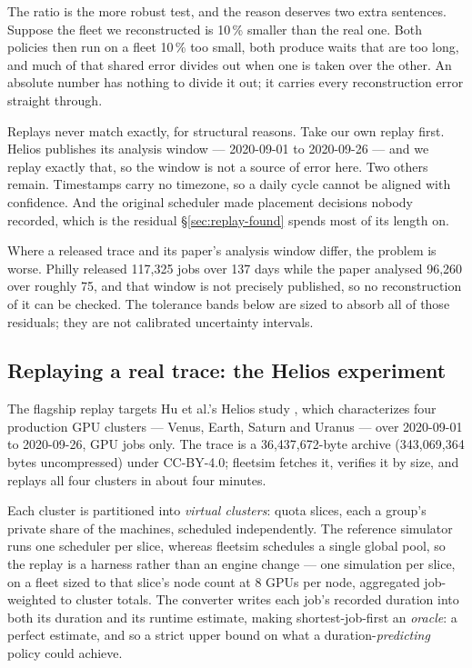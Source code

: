 The ratio is the more robust test, and the reason deserves two extra sentences.
Suppose the fleet we reconstructed is 10\,\% smaller than the real one. Both
policies then run on a fleet 10\,\% too small, both produce waits that are too
long, and much of that shared error divides out when one is taken over the other.
An absolute number has nothing to divide it out; it carries every reconstruction
error straight through.

Replays never match exactly, for structural reasons. Take our own replay first.
Helios publishes its analysis window --- 2020-09-01 to 2020-09-26 --- and we
replay exactly that, so the window is not a source of error here. Two others
remain. Timestamps carry no timezone, so a daily cycle cannot be aligned with
confidence. And the original scheduler made placement decisions nobody recorded,
which is the residual \S\ref{sec:replay-found} spends most of its length on.

Where a released trace and its paper's analysis window differ, the problem is
worse. Philly released 117{,}325 jobs over 137 days while the paper analysed
96{,}260 over roughly 75, and that window is not precisely published, so no
reconstruction of it can be checked. The tolerance bands below are sized to
absorb all of those residuals; they are not calibrated uncertainty intervals.

\subsection{Replaying a real trace: the Helios experiment}
\label{sec:helios}

The flagship replay targets Hu et al.'s Helios study \cite{helios2021}, which
characterizes four production GPU clusters --- Venus, Earth, Saturn and Uranus
--- over 2020-09-01 to 2020-09-26, GPU jobs only. The trace is a
36{,}437{,}672-byte archive (343{,}069{,}364 bytes uncompressed) under CC-BY-4.0;
fleetsim fetches it, verifies it by size, and replays all four clusters in about
four minutes.

Each cluster is partitioned into \emph{virtual clusters}: quota slices, each a
group's private share of the machines, scheduled independently. The reference
simulator runs one scheduler per slice, whereas fleetsim schedules a single
global pool, so the replay is a harness rather than an engine change --- one
simulation per slice, on a fleet sized to that slice's node count at 8 GPUs per
node, aggregated job-weighted to cluster totals. The converter writes each job's
recorded duration into both its duration and its runtime estimate, making
shortest-job-first an \emph{oracle}: a perfect estimate, and so a strict upper
bound on what a duration-\emph{predicting} policy could achieve.

